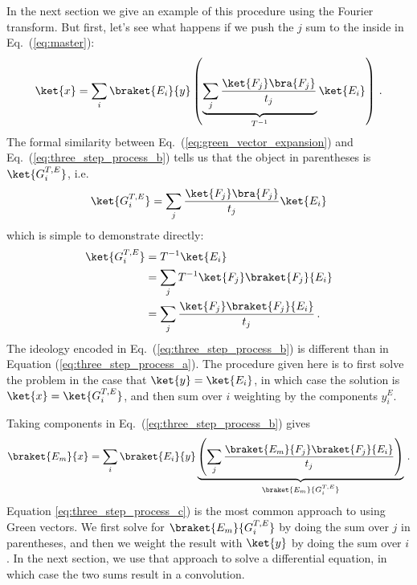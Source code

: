 In the next section we give an example of this procedure using the Fourier transform.
But first, let's see what happens if we push the $j$ sum to the inside in Eq.~(\ref{eq:master}):
\begin{equation}
  \ket{x}
  = \sum_i \braket{E_i}{y}
  \left(
    \underbrace{\sum_j \frac{\ket{F_j} \bra{F_j}}{t_j}}_{T^{-1}} \ket{E_i}
  \right)
  \, . \label{eq:three_step_process_b}
\end{equation}
The formal similarity between Eq.~(\ref{eq:green_vector_expansion}) and Eq.~(\ref{eq:three_step_process_b}) tells us that the object in parentheses is $\ket{G_i^{T,E}}$, i.e.
\begin{equation}
  \ket{G_i^{T,E}} = \sum_j \frac{\ket{F_j}\bra{F_j}}{t_j} \ket{E_i}
\end{equation}
which is simple to demonstrate directly:
\begin{align}
  \ket{G_i^{T,E}}
  &= T^{-1} \ket{E_i} \nonumber \\
  &= \sum_j T^{-1} \ket{F_j} \braket{F_j}{E_i} \nonumber \\
  &= \sum_j \frac{\ket{F_j} \braket{F_j}{E_i}}{t_j}
  \, .
\end{align}
The ideology encoded in Eq.~(\ref{eq:three_step_process_b}) is different than in Equation (\ref{eq:three_step_process_a}).
The procedure given here is to first solve the problem in the case that $\ket{y} = \ket{E_i}$, in which case the solution is $\ket{x} = \ket{G_i^{T, E}}$, and then sum over $i$ weighting by the components $y_i^E$.

Taking components in Eq.~(\ref{eq:three_step_process_b}) gives
\begin{equation}
  \braket{E_m}{x}
  = \sum_i \braket{E_i}{y}
  \underbrace{ \left( \sum_j \frac{\braket{E_m}{F_j} \braket{F_j}{E_i}}{t_j} \right)}_{\braket{E_m}{G_i^{T,E}}}
  \, . \label{eq:three_step_process_c}
\end{equation}
Equation \ref{eq:three_step_process_c}) is the most common approach to using Green vectors.
We first solve for $\braket{E_m}{G_i^{T,E}}$ by doing the sum over $j$ in parentheses, and then we weight the result with $\ket{y}$ by doing the sum over $i$.
In the next section, we use that approach to solve a differential equation, in which case the two sums result in a convolution.
